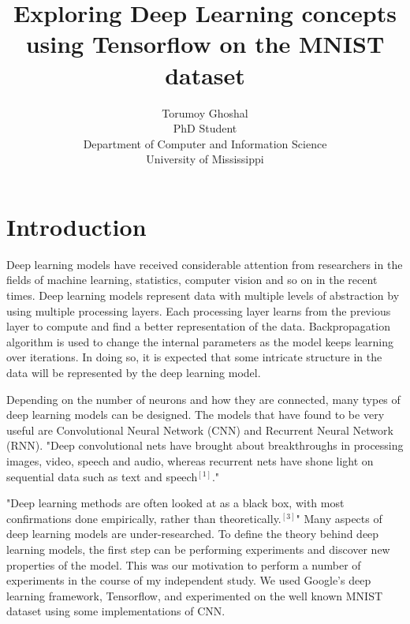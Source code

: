 \documentclass{article}
\begin{document}
\title{Exploring Deep Learning concepts using Tensorflow on the MNIST dataset}

\author{Torumoy Ghoshal \\ PhD Student\\ Department of Computer and Information Science \\ University of Mississippi}
\maketitle

\section*{Introduction}
Deep learning models have received considerable attention from researchers in the fields of machine learning, statistics, computer vision and so on in the recent times. Deep learning models represent data with multiple levels of abstraction by using multiple processing layers. Each processing layer learns from the previous layer to compute and find a better representation of the data. Backpropagation algorithm is used to change the internal parameters as the model keeps learning over iterations. In doing so, it is expected that some  intricate structure in the data will be represented by the deep learning model.

Depending on the number of neurons and how they are connected, many types of deep learning models can be designed. The models that have found to be very useful are Convolutional Neural Network (CNN) and Recurrent Neural Network (RNN). "Deep convolutional nets have brought about breakthroughs in processing images, video, speech and audio, whereas recurrent nets have shone light on sequential data such as text and speech$^{[1]}$."

"Deep learning methods are often looked at as a black box, with most confirmations done empirically, rather than theoretically.$^{[3]}$" Many aspects of deep learning models are under-researched. To define the theory behind deep learning models, the first step can be performing experiments and discover new properties of the model. This was our motivation to perform a number of experiments in the course of my independent study. We used Google's deep learning framework, Tensorflow, and experimented on the well known MNIST dataset using some implementations of CNN.
\end{document}
